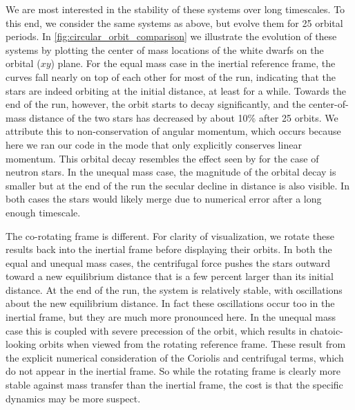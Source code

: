 \documentclass[12pt]{article}
\begin{document}


We are most interested in the stability of these systems over long
timescales. To this end, we consider the same systems as above, but
evolve them for 25 orbital periods. In
\autoref{fig:circular_orbit_comparison} we illustrate the evolution of
these systems by plotting the center of mass locations of the white
dwarfs on the orbital ($xy$) plane. For the equal mass case in the
inertial reference frame, the curves fall nearly on top of each
other for most of the run, indicating that the stars are indeed
orbiting at the initial distance, at least for a while. Towards the end
of the run, however, the orbit starts to decay significantly, and the center-of-mass
distance of the two stars has decreased by about 10\% after 25 orbits.
We attribute this to non-conservation of angular momentum, which occurs
because here we ran our code in the mode that  only explicitly conserves
linear momentum. This orbital decay resembles the effect seen by \citet{swc:2000}
for the case of neutron stars. In the unequal mass case, the magnitude of
the orbital decay is smaller but at the end of the run the secular decline
in distance is also visible. In both cases the stars would likely merge due
to numerical error after a long enough timescale.

The co-rotating frame is different.  For clarity of visualization, we
rotate these results back into the inertial frame before displaying
their orbits.  In both the equal and unequal mass cases, the centrifugal force
pushes the stars outward toward a new equilibrium distance that is a few
percent larger than its initial distance. At the end of the run, the system is
relatively stable, with oscillations about the new equilibrium distance. In fact
these oscillations occur too in the inertial frame, but they are much more pronounced
here. In the unequal mass case this is coupled with severe precession of the orbit,
which results in chatoic-looking orbits when viewed from the rotating reference frame.
These result from the explicit numerical consideration of the Coriolis and centrifugal
terms, which do not appear in the inertial frame. So while the rotating frame
is clearly more stable against mass transfer than the inertial frame,
the cost is that the specific dynamics may be more suspect.
\end{document}
